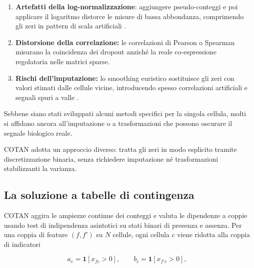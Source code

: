 \begin{enumerate}
    \item \textbf{Artefatti della log-normalizzazione}: aggiungere pseudo-conteggi e poi applicare il logaritmo distorce le misure di bassa abbondanza, comprimendo gli zeri in pattern di scala artificiali \cite{galfre2021cotan}.
    
    \item \textbf{Distorsione della correlazione:} le correlazioni di Pearson o Spearman misurano la coincidenza dei dropout anziché la reale co-espressione regolatoria nelle matrici sparse\cite{galfre2021cotan}.
    
    \item \textbf{Rischi dell'imputazione:} lo smoothing euristico sostituisce gli zeri con valori stimati dalle cellule vicine, introducendo spesso correlazioni artificiali e segnali spuri a valle \cite{galfre2021cotan}.
\end{enumerate}

Sebbene siano stati sviluppati alcuni metodi specifici per la singola cellula, molti si affidano ancora all'imputazione o a trasformazioni che possono oscurare il segnale biologico reale.


COTAN adotta un approccio diverso: tratta gli zeri in modo esplicito tramite discretizzazione binaria, senza richiedere imputazione né trasformazioni stabilizzanti la varianza.

\subsection{La soluzione a tabelle di contingenza}
COTAN aggira le ampiezze continue dei conteggi e valuta le dipendenze a coppie usando test di indipendenza asintotici su stati binari di presenza e assenza\cite{galfre2021cotan}. Per una coppia di feature $(f, f')$ su $N$ cellule, ogni cellula $c$ viene ridotta alla coppia di indicatori

$$a_c = \mathbf{1}[x_{fc} > 0], \qquad b_c = \mathbf{1}[x_{f'c} > 0],$$

